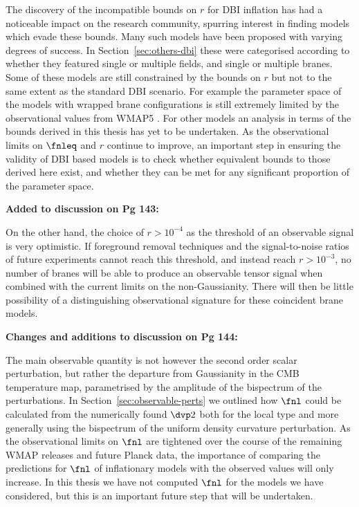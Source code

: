The discovery of the incompatible bounds on $r$ for DBI inflation has had a noticeable
impact on the research community, spurring interest in finding models which evade
these bounds. Many such models have been proposed with varying degrees of success. In
Section~\ref{sec:others-dbi} these were categorised according to whether they
featured single or multiple fields, and single or multiple branes. Some of these models are still
constrained by the bounds on $r$ but not to the same extent as the standard DBI scenario. For
example the parameter space of the models with wrapped brane configurations is still extremely
limited by the observational values from WMAP5 \cite{Alabidi:2008ej}. For other models an analysis
in terms of the bounds derived in this thesis has yet to be undertaken. As the observational limits
on $\fnleq$ and $r$ continue to improve, an important step in ensuring the validity of DBI based
models is to check whether equivalent bounds to those derived here exist, and whether they can be
met for any significant proportion of the parameter space.


\textbf{Added to discussion on Pg 143:}

On the other hand, the choice of $r>10^{-4}$ as the threshold of an observable signal is very
optimistic. If foreground removal techniques and the signal-to-noise ratios of future experiments
cannot reach this threshold, and instead reach $r>10^{-3}$, no number of branes will be able to
produce an observable tensor signal when combined with the current limits on the non-Gaussianity.
There will then be little possibility of a distinguishing
observational signature for these coincident brane models.

\textbf{Changes and additions to discussion on Pg 144:}

The main observable quantity is not however the second order scalar perturbation, but rather the
departure from Gaussianity in the CMB temperature map, parametrised by the amplitude of the
bispectrum of the perturbations. In Section~\ref{sec:observable-perts} we outlined how $\fnl$ could
be calculated from the numerically found $\dvp2$ both for the local type and more generally using
the bispectrum of the uniform density curvature perturbation. As the observational limits on $\fnl$
are tightened over the course of the remaining WMAP releases and future Planck data, the importance
of comparing the predictions for $\fnl$ of inflationary models with the observed values will only
increase. In this thesis we have not computed $\fnl$ for the models we have considered, but this is
an important future step that will be undertaken.
 
